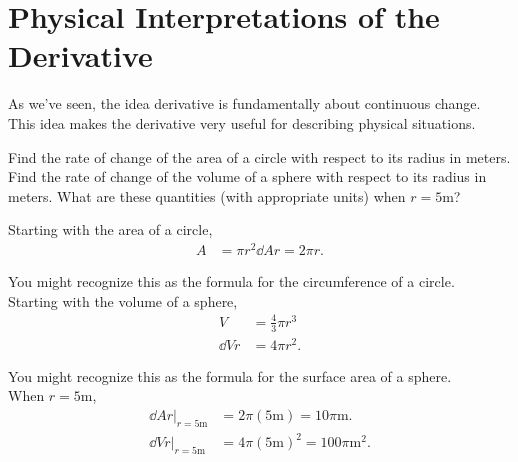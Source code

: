 \section{Physical Interpretations of the Derivative}
As we've seen, the idea derivative is fundamentally about continuous change.
This idea makes the derivative very useful for describing physical situations.

\begin{example}
		Find the rate of change of the area of a circle with respect to its radius in meters.
		Find the rate of change of the volume of a sphere with respect to its radius in meters.
		What are these quantities (with appropriate units) when $r=5\text{m}$?
\end{example}
\begin{answer}
	Starting with the area of a circle,
	\begin{align*}
		A &= \pi r^2
		\dd{A}{r} = 2\pi r.
	\end{align*}
	
	You might recognize this as the formula for the circumference of a circle.\\
	
	Starting with the volume of a sphere,
	\begin{align*}
		V &= \frac{4}{3}\pi r^3 \\
		\dd{V}{r} &= 4\pi r^2.
	\end{align*}
	
	You might recognize this as the formula for the surface area of a sphere.\\
	
	When $r=5\text{m}$,
	\begin{align*}
		\dd{A}{r}\biggr\rvert_{r=5\text{m}} &= 2\pi\left(5\text{m}\right) = 10\pi\text{m}. \\
		\dd{V}{r}\biggr\rvert_{r=5\text{m}} &= 4\pi\left(5\text{m}\right)^2 = 100\pi\text{m}^2.
	\end{align*}
\end{answer}

